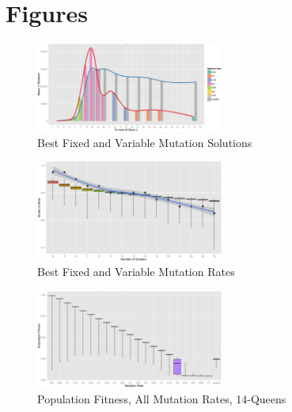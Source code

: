 \documentclass[conference]{IEEEtran}
\begin{document}
% 
%
\section{Figures}
\begin{figure}
\centering
\includegraphics[width=0.55\textwidth]{best_solution_all_queens.png}
\vspace{-18pt}
\caption{Best Fixed and Variable Mutation Solutions}
\label{fig:best_solution_all_queens}
\end{figure}

\begin{figure}
\centering
\includegraphics[width=0.55\textwidth]{mutation_rate_all_queens.png}
\vspace{-18pt}
\caption{Best Fixed and Variable Mutation Rates}
\label{fig:mutation_rate_all_queens}
\end{figure}

\begin{figure}
\centering
\includegraphics[width=0.55\textwidth]{fitness_all_mutation_14q.png}
\vspace{-18pt}
\caption{Population Fitness, All Mutation Rates, 14-Queens}
\label{fig:fitness_all_mutation_14}
\end{figure}
\end{document}
